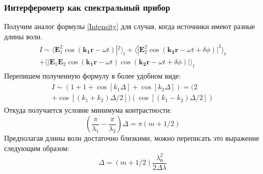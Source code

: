 \documentclass[%
reprint,
russian,
 amsmath,amssymb,
 aps,
]{revtex4-2}
\begin{document}
\subsubsection{\label{sec:level3}Интерферометр как спектральный прибор}
Получим аналог формулы \ref{Intensity} для случая, когда источники имеют разные длины волн.
\begin{equation*}
    \begin{split}
   		\begin{aligned}
   			I \sim \langle \mathbf{E}^2_1 \cos(\mathbf{k_1 r} - \omega t)|^2 \rangle_t +
   			\langle |\mathbf{E}^2_2 \cos(\mathbf{k_2 r} - \omega t + \delta \phi)|^2 \rangle_t\\
   			+ \langle |\mathbf{E}_1 \mathbf{E}_2\cos(\mathbf{k_1r} - \omega t)\cos(\mathbf{k_2 r} - \omega t + \delta \phi)| \rangle_t
   		\end{aligned}
   	\end{split}
\end{equation*}
Перепишем полученную формулу в более удобном виде:
\begin{equation*}
    \begin{split}
   		\begin{aligned}
        	I \sim (1 + 1 + \cos[k_1 \Delta] + \cos[k_2 \Delta]) = (2 \\
        	+ \cos[(k_1 + k_2) \Delta / 2]) (\cos[(k_1 - k_2)\Delta/2])
   		\end{aligned}
   	\end{split}
\end{equation*}
Откуда получается условие минимума контрастности:
\begin{equation*}
    (\frac{\pi}{\lambda_1} - \frac{\pi}{\lambda_2}) \Delta = \pi (m + 1/2)
\end{equation*}
Предполагая длины волн достаточно близкими, можно переписать это выражение следующим образом:
\begin{equation}
    \label{Spectrum}
    \Delta = (m + 1/2) \frac{\lambda_0^2}{2\Delta \lambda}
\end{equation}
\end{document}
